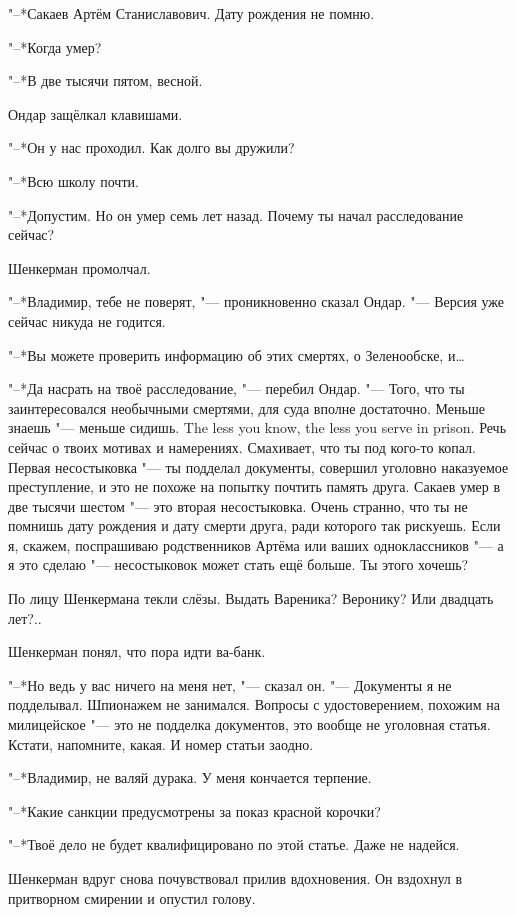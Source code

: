 "--*Сакаев Артём Станиславович.
Дату рождения не помню.

"--*Когда умер?

"--*В две тысячи пятом, весной.

Ондар защёлкал клавишами.

"--*Он у нас проходил.
Как долго вы дружили?

"--*Всю школу почти.

"--*Допустим.
Но он умер семь лет назад.
Почему ты начал расследование сейчас?

Шенкерман промолчал.

"--*Владимир, тебе не поверят, "--- проникновенно сказал Ондар.
"--- Версия уже сейчас никуда не годится.

"--*Вы можете проверить информацию об этих смертях, о Зеленообске, и\ldots{}

"--*Да насрать на твоё расследование, "--- перебил Ондар.
"--- Того, что ты заинтересовался необычными смертями, для суда вполне достаточно.
{Меньше знаешь "--- меньше сидишь.}
{The less you know, the less you serve in prison.}
Речь сейчас о твоих мотивах и намерениях.
Смахивает, что ты под кого-то копал.
Первая несостыковка "--- ты подделал документы, совершил уголовно наказуемое преступление, и это не похоже на попытку почтить память друга.
Сакаев умер в две тысячи шестом "--- это вторая несостыковка.
Очень странно, что ты не помнишь дату рождения и дату смерти друга, ради которого так рискуешь.
Если я, скажем, поспрашиваю родственников Артёма или ваших одноклассников "--- а я это сделаю "--- несостыковок может стать ещё больше.
Ты этого хочешь?

По лицу Шенкермана текли слёзы.
Выдать Вареника?
Веронику?
Или двадцать лет?..

Шенкерман понял, что пора идти ва-банк.

"--*Но ведь у вас ничего на меня нет, "--- сказал он.
"--- Документы я не подделывал.
Шпионажем не занимался.
Вопросы с удостоверением, похожим на милицейское "--- это не подделка документов, это вообще не уголовная статья.
Кстати, напомните, какая.
И номер статьи заодно.

"--*Владимир, не валяй дурака.
У меня кончается терпение.

"--*Какие санкции предусмотрены за показ красной корочки?

"--*Твоё дело не будет квалифицировано по этой статье.
Даже не надейся.

Шенкерман вдруг снова почувствовал прилив вдохновения.
Он вздохнул в притворном смирении и опустил голову.

